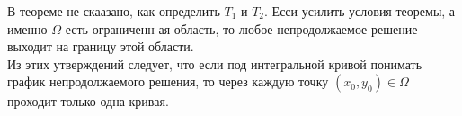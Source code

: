	\begin{remark}
	    В теореме не скаазано, как определить $T_1$ и $T_2$. Есси усилить условия теоремы, а именно $\Omega$ есть ограниченн ая область, то любое непродолжаемое решение выходит на границу этой области.\\
	    Из этих утверждений следует, что если под интегральной кривой понимать график непродолжаемого решения, то через каждую точку $(x_0, y_0) \in \Omega$ проходит только одна кривая.
	\end{remark}
	

